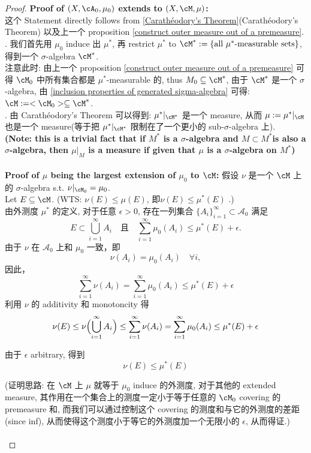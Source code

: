 \documentclass[lang=cn,11pt]{elegantbook}
\begin{document}
\begin{proof}
\textbf{Proof of $(X,\cA_0, \mu_0)$ extends to $(X,\cM,\mu)$:}\\
这个 Statement directly follows from \ref{Carathéodory's Theorem}(Carathéodory's Theorem) 以及上一个 proposition \ref{construct outer measure out of a premeasure}. \\
. 我们首先用 $\mu_0$ induce 出 $\mu^*$, 再 restrict $\mu^*$ to $ \cM^* :=\{ \text{all } \mu^* \text{-measurable sets}  \}$, 得到一个 $\sigma$-algebra $\cM^*$.\\
\noindent 注意此时: 由上一个 proposition \ref{construct outer measure out of a premeasure} 可得 $\cM_0$ 中所有集合都是 $\mu^*$-measurable 的, thus $M_0 \sub \cM^*$, 由于 $\cM^*$ 是一个 $\sigma$-algebra, 由 \ref{inclusion properties of generated sigma-algebra} 可得: $\cM := <\cM_0> \sub \cM^*$. \\
. 由 Carathéodory's Theorem 可以得到: $\mu^* | _{\cM^*}$ 是一个 measure, 从而 $\mu :=\mu^* |_{\cM}$ 也是一个 measure(等于把 $\mu^* | _{\cM^*}$ 限制在了一个更小的 sub-$\sigma$-algebra 上).\\
\noindent\textbf{(Note: this is a trivial fact that if $M^*$ is a $\sigma$-algebra and $M \subset M^*$is also a $\sigma$-algebra, then $\mu |_{M}$ is a measure if given that $\mu$ is a $\sigma$-algebra on $M^*$)}\\\\
\noindent \textbf{Proof of $\mu$ being the largest extension of $\mu_0$ to $\cM$:}
\noindent 假设 $\nu$ 是一个 $\cM$ 上的 $\sigma$-algebra s.t. $\nu|_{\cM_0} = \mu_0 $.\\
\noindent Let $E \sub \cM$. (WTS: $\nu(E) \leq \mu(E)$, 即$\nu(E) \leq \mu^*(E)$ .)\\
\noindent 由外测度 \(\mu^*\) 的定义, 对于任意 \(\epsilon>0\), 存在一列集合 \(\{A_i\}_{i=1}^\infty \subset \mathcal{A}_0\) 满足
\[
E\subset \bigcup_{i=1}^\infty A_i \quad \text{且} \quad \sum_{i=1}^\infty \mu_0(A_i) \le \mu^*(E)+\epsilon.
\]
由于 \(\nu\) 在 \(\mathcal{A}_0\) 上和 \(\mu_0\) 一致，即
\[
\nu(A_i) = \mu_0(A_i) \quad \forall i,
\]
因此，
\[
\sum_{i=1}^\infty \nu(A_i) = \sum_{i=1}^\infty \mu_0(A_i) \le \mu^*(E)+\epsilon
\]
利用 \(\nu\) 的 additivity 和 monotoncity 得
\[
\nu(E) \le \nu\Bigl(\bigcup_{i=1}^\infty A_i\Bigr) \le \sum_{i=1}^\infty \nu(A_i) = \sum_{i=1}^\infty \mu_0(A_i) \le \mu^*(E)+\epsilon
\]

由于 \(\epsilon\) arbitrary, 得到
\[
\nu(E) \le \mu^*(E)
\]


\noindent (证明思路: 在 $\cM$ 上 $\mu$ 就等于 $\mu_0$ induce 的外测度, 对于其他的 extended measure, 其作用在一个集合上的测度一定小于等于任意的 $\cM_0$ covering 的 premeasure 和, 而我们可以通过控制这个 covering 的测度和与它的外测度的差距(since inf), 从而使得这个测度小于等它的外测度加一个无限小的 $\epsilon$, 从而得证.) \\\\


\end{proof}
\end{document}
